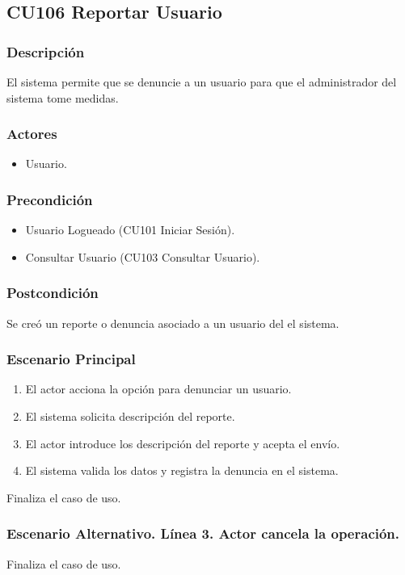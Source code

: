 \subsection{CU106 Reportar Usuario}
\subsubsection{Descripci\'{o}n}
El sistema permite que se denuncie a un usuario para que el administrador del sistema tome medidas.
\subsubsection{Actores}
\begin{itemize}
\item Usuario.
\end{itemize}
\subsubsection{Precondici\'{o}n}
\begin{itemize}
\item Usuario Logueado (CU101 Iniciar Sesi\'{o}n).
\item Consultar Usuario (CU103 Consultar Usuario).
\end{itemize}
\subsubsection{Postcondici\'{o}n}
Se cre\'{o} un reporte o denuncia asociado a un usuario del el sistema.
\subsubsection{Escenario Principal}
\begin{enumerate}
\item El actor acciona la opci\'{o}n para denunciar un usuario.
\item El sistema solicita descripci\'{o}n del reporte.
\item El actor introduce los descripci\'{o}n del reporte y acepta el env\'{i}o.
\item El sistema valida los datos y registra la denuncia en el sistema.
\end{enumerate}
Finaliza el caso de uso.
\subsubsection{Escenario Alternativo. L\'{i}nea 3. Actor cancela la operaci\'{o}n.}
Finaliza el caso de uso.
